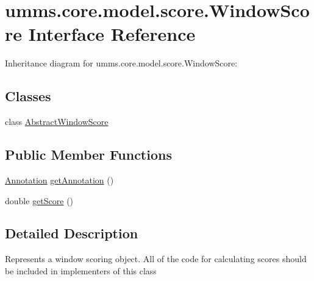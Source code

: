 \hypertarget{interfaceumms_1_1core_1_1model_1_1score_1_1_window_score}{\section{umms.\+core.\+model.\+score.\+Window\+Score Interface Reference}
\label{interfaceumms_1_1core_1_1model_1_1score_1_1_window_score}
}


Inheritance diagram for umms.\+core.\+model.\+score.\+Window\+Score\+:
\subsection*{Classes}
\begin{DoxyCompactItemize}
\item 
class \hyperlink{classumms_1_1core_1_1model_1_1score_1_1_window_score_1_1_abstract_window_score}{Abstract\+Window\+Score}
\end{DoxyCompactItemize}
\subsection*{Public Member Functions}
\begin{DoxyCompactItemize}
\item 
\hyperlink{interfaceumms_1_1core_1_1annotation_1_1_annotation}{Annotation} \hyperlink{interfaceumms_1_1core_1_1model_1_1score_1_1_window_score_ade117fa7e14c8e6839af41f8a9f1cbb2}{get\+Annotation} ()
\item 
double \hyperlink{interfaceumms_1_1core_1_1model_1_1score_1_1_window_score_a5232038f3397874511f1e8d83df72e97}{get\+Score} ()
\end{DoxyCompactItemize}


\subsection{Detailed Description}
Represents a window scoring object. All of the code for calculating scores should be included in implementers of this class 

